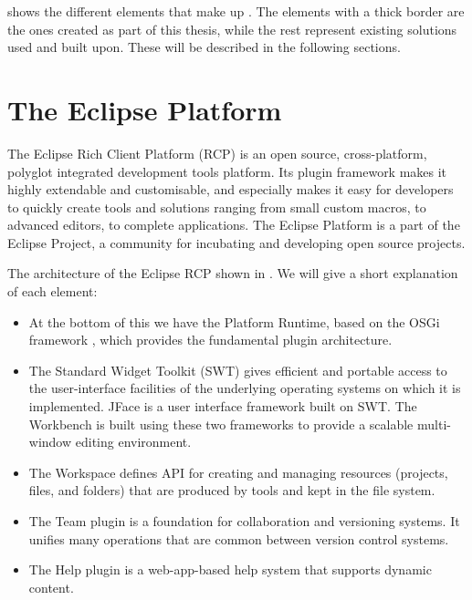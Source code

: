 	
	 shows the different elements that make up \thename{}.
	The elements with a thick border are the ones created as part of this thesis,
	while the rest represent existing solutions used and built upon. These will
	be described in the following sections. 

\section{The Eclipse Platform}
The Eclipse Rich Client Platform (RCP) \cite{eclipse} is an open source,
cross-platform, polyglot integrated development tools platform.
Its plugin framework makes it highly extendable and customisable, and
especially makes it easy for developers to quickly create tools and
solutions ranging from small custom macros, to advanced editors, to complete
applications. The Eclipse Platform is a part of the Eclipse Project, a community
for incubating and developing open source projects. 


The architecture of the Eclipse RCP shown in . We will
give a short explanation of each element:

\begin{itemize}
	\item At the bottom of this we have the Platform Runtime, based on the OSGi
	framework \cite{alliance2007osgi}, which provides the fundamental plugin
	architecture.

	\item The Standard Widget Toolkit (SWT) gives efficient and portable access to
	the user-interface facilities of the underlying operating systems on which it is
	implemented. JFace is a user interface framework built on SWT. The Workbench
	is built using these two frameworks to provide a scalable multi-window editing
	environment.
	
	\item The Workspace defines API for creating and managing resources (projects,
	files, and folders) that are produced by tools and kept in the file system.
	
	\item The Team plugin is a foundation for collaboration and versioning systems.
	It unifies many operations that are common between version control systems.
	
	\item The Help plugin is a web-app-based help system that supports dynamic
	content.
\end{itemize}
	
